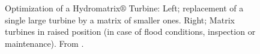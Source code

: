 \begin{figure}[h!]
\begin{minipage}[b]{0.5\linewidth}
 \centering
\end{minipage}
\begin{minipage}[b]{0.5\linewidth}
 \centering
\end{minipage}
\caption{Optimization of a Hydromatrix$\circledR$ Turbine: Left; replacement of a single large turbine by a matrix of smaller ones. Right; Matrix turbines in raised position (in case of flood conditions, inspection or maintenance). From \cite{matrix,matrix_2}.}
\label{Matrix_a}
\end{figure}

